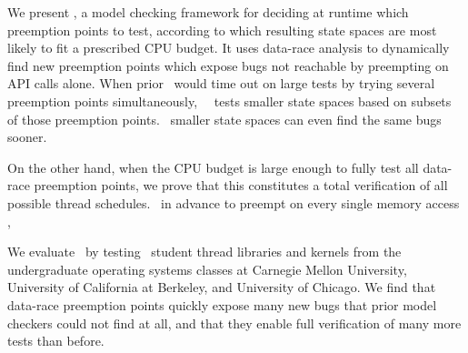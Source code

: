 We present \quicksand,
a model checking framework for deciding at runtime which preemption points to test,
according to which resulting state spaces are most likely to fit a prescribed CPU budget.
It uses data-race analysis \cite{eraser} to dynamically find new preemption points which expose bugs not reachable by preempting on API calls alone.
When prior ~would time out on large tests by trying several preemption points simultaneously,
\quicksand~~tests smaller state spaces based on subsets of those preemption points.
~smaller state spaces can even find the same bugs sooner.


On the other hand, when the CPU budget is large enough to fully test all data-race preemption points,
we prove that this constitutes a total verification of all possible thread schedules.
~in advance to preempt on every single memory access \cite{spin}, 


We evaluate \quicksand~by testing \numstudence~student thread libraries and kernels from the undergraduate operating systems classes at Carnegie Mellon University, University of California at Berkeley, and University of Chicago.
We find that data-race preemption points quickly expose many new bugs that prior model checkers could not find at all,
and that they enable full verification of many more tests than before.

